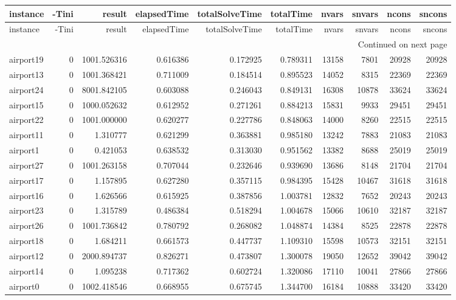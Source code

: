 \begin{longtable}{|l|r|r|r|r|r|r|r|r|r|}
\toprule
instance & -Tini & result & elapsedTime & totalSolveTime & totalTime & nvars & snvars & ncons & sncons \\
\midrule
\endfirsthead
\toprule
instance & -Tini & result & elapsedTime & totalSolveTime & totalTime & nvars & snvars & ncons & sncons \\
\midrule
\endhead
\midrule
\multicolumn{10}{r}{Continued on next page} \\
\midrule
\endfoot
\bottomrule
\endlastfoot
airport19 & 0 & 1001.526316 & 0.616386 & 0.172925 & 0.789311 & 13158 & 7801 & 20928 & 20928 \\
airport13 & 0 & 1001.368421 & 0.711009 & 0.184514 & 0.895523 & 14052 & 8315 & 22369 & 22369 \\
airport24 & 0 & 8001.842105 & 0.603088 & 0.246043 & 0.849131 & 16308 & 10878 & 33624 & 33624 \\
airport15 & 0 & 1000.052632 & 0.612952 & 0.271261 & 0.884213 & 15831 & 9933 & 29451 & 29451 \\
airport22 & 0 & 1001.000000 & 0.620277 & 0.227786 & 0.848063 & 14000 & 8260 & 22515 & 22515 \\
airport11 & 0 & 1.310777 & 0.621299 & 0.363881 & 0.985180 & 13242 & 7883 & 21083 & 21083 \\
airport1 & 0 & 0.421053 & 0.638532 & 0.313030 & 0.951562 & 13382 & 8688 & 25019 & 25019 \\
airport27 & 0 & 1001.263158 & 0.707044 & 0.232646 & 0.939690 & 13686 & 8148 & 21704 & 21704 \\
airport17 & 0 & 1.157895 & 0.627280 & 0.357115 & 0.984395 & 15428 & 10467 & 31618 & 31618 \\
airport16 & 0 & 1.626566 & 0.615925 & 0.387856 & 1.003781 & 12832 & 7652 & 20243 & 20243 \\
airport23 & 0 & 1.315789 & 0.486384 & 0.518294 & 1.004678 & 15066 & 10610 & 32187 & 32187 \\
airport26 & 0 & 1001.736842 & 0.780792 & 0.268082 & 1.048874 & 14384 & 8525 & 22878 & 22878 \\
airport18 & 0 & 1.684211 & 0.661573 & 0.447737 & 1.109310 & 15598 & 10573 & 32151 & 32151 \\
airport12 & 0 & 2000.894737 & 0.826271 & 0.473807 & 1.300078 & 19050 & 12652 & 39042 & 39042 \\
airport14 & 0 & 1.095238 & 0.717362 & 0.602724 & 1.320086 & 17110 & 10041 & 27866 & 27866 \\
airport0 & 0 & 1002.418546 & 0.668955 & 0.675745 & 1.344700 & 16184 & 10888 & 33420 & 33420 \\

\end{longtable}
